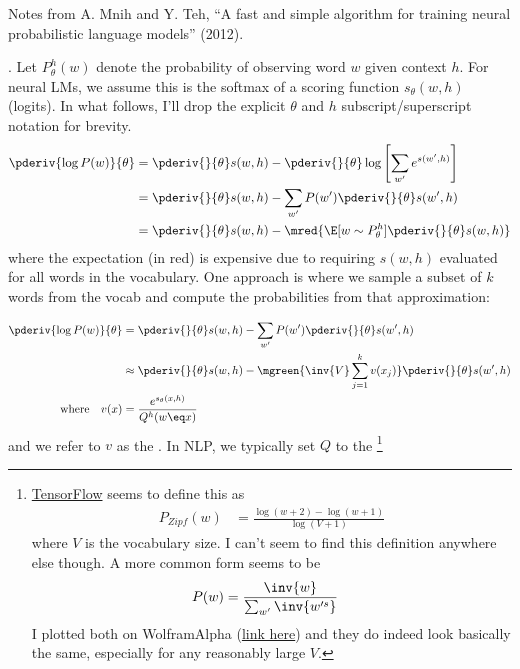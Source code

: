 \documentclass[11pt]{article}
\newcommand\myspace[1][]{\vspace{#1\bigskipamount}}
\newcommand\p{\Needspace{10\baselineskip} \noindent}
\newcommand\bluesec[1]{\myspace \p \blue{#1}}
\begin{document}
Notes from A. Mnih and Y. Teh, ``A fast and simple algorithm for training neural probabilistic language models'' (2012). 

\bluesec{Maximum likelihood learning}. Let $P_{\theta}^h(w)$ denote the probability of observing word $w$ given context $h$. For neural LMs, we assume this is the softmax of a scoring function $s_{\theta}(w, h)$ (logits). In what follows, I'll drop the explicit $\theta$ and $h$ subscript/superscript notation for brevity.
\begin{align}
	\pderiv{\log P(w)}{\theta}
		&= \pderiv{}{\theta} s(w, h) - \pderiv{}{\theta} \log \left[ \sum_{w'} e^{s(w', h)} \right] \\
		&= \pderiv{}{\theta} s(w, h) - \sum_{w'} P(w') \pderiv{}{\theta} s(w', h) \\
		&=  \pderiv{}{\theta} s(w, h) - \mred{ \E[w \sim P_{\theta}^{h}]{\pderiv{}{\theta} s(w, h)} }
\end{align}
where the expectation (in red) is expensive due to requiring $s(w, h)$ evaluated for all words in the vocabulary. One approach is  where we sample a subset of $k$ words from the vocab and compute the probabilities from that approximation:

\begin{align}
	\pderiv{\log P(w)}{\theta}
		&= \pderiv{}{\theta} s(w, h) - \sum_{w'} P(w') \pderiv{}{\theta} s(w', h) \\
		&\approx  \pderiv{}{\theta} s(w, h) - \mgreen{ \inv{V} \sum_{j=1}^{k} v(x_j) }  \pderiv{}{\theta} s(w', h) \\
		\text{where} 
		\quad 
		v(x)
			&= \frac{ e^{s_{\theta}(x, h)}    }{Q^h(w \eq x)} 
\end{align} 
and we refer to $v$ as the . In NLP, we typically set $Q$ to the \footnote{\href{https://www.tensorflow.org/api_docs/python/tf/random/log_uniform_candidate_sampler}{TensorFlow} seems to define this as
	\begin{align}
		P_{Zipf}(w) &= \frac{  \log(w + 2) - \log(w + 1) }{   \log(V + 1)   }
	\end{align}
	where $V$ is the vocabulary size. I can't seem to find this definition anywhere else though. A more common form seems to be
	\begin{align}
		P(w) &= \frac{ \inv{w} }{  \sum_{w'} \inv{ w'^{s} } }
	\end{align}
	I plotted both on WolframAlpha (\href{https://www.wolframalpha.com/input/?i=plot+\%281\%2Fx+\%2F+5.187377517639620260805117675658253\%29+and+\%28log\%28x\%2B2\%29+-+log\%28x\%2B1\%29\%29+\%2F+log\%28100+\%2B+1\%29+for+x\%3D1+to+100}{link here}) and they do indeed look basically the same, especially for any reasonably large $V$. 
}
\end{document}
